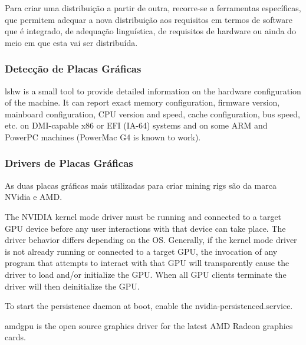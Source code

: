 \documentclass[
	article,			%
	12pt,				%
	openright,			%
	oneside,			%
	a4paper,			%
	chapter=TITLE,		%
	section=TITLE,		%
	subsection=TITLE,	%
	subsubsection=TITLE,%
	subsubsubsection=TITLE, %
	english,			%
	brazil,				%
	]{abntex2}
\begin{document}
Para criar uma distribuição a partir de outra, recorre-se a ferramentas específicas, que permitem adequar a nova distribuição aos requisitos em termos de software que é integrado, de adequação linguística, de requisitos de hardware ou ainda do meio em que esta vai ser distribuída.

\cite{Nunes2009}

\subsubsection{Detecção de Placas Gráficas}


lshw is a small tool to provide detailed information on the hardware configuration of the machine. It can report exact memory configuration, firmware version, mainboard configuration, CPU version and speed, cache configuration, bus speed, etc. on DMI-capable x86 or EFI (IA-64) systems and on some ARM and PowerPC machines (PowerMac G4 is known to work).

\cite{Vincent2018}

\subsubsection{Drivers de Placas Gráficas}

As duas placas gráficas mais utilizadas para criar mining rigs são da marca NVidia e AMD.

\cite{CoinMiningRigs2018}


The NVIDIA kernel mode driver must be running and connected to a target GPU device before any user interactions with that device can take place. The driver behavior differs depending on the OS. Generally, if the kernel mode driver is not already running or connected to a target GPU, the invocation of any program that attempts to interact with that GPU will transparently cause the driver to load and/or initialize the GPU. When all GPU clients terminate the driver will then deinitialize the GPU.

\cite{NVidia2017}

To start the persistence daemon at boot, enable the nvidia-persistenced.service.

\cite{ArchWiki2018}


amdgpu is the open source graphics driver for the latest AMD Radeon graphics cards.
\end{document}
